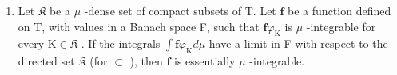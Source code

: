 \begin{enumerate}
\def\labelenumi{\arabic{enumi})}
\setcounter{enumi}{5}
\tightlist
\item
  Let \(\mathfrak{K}\) be a \(\mu\) -dense set of compact subsets of T. Let \(\mathbf{f}\) be a function defined on T, with values in a Banach space F, such that \(\mathbf{f}\varphi_{\mathrm{K}}\) is \(\mu\) -integrable for every \(\mathrm{K} \in \mathfrak{K}\) . If the integrals \(\int \mathbf{f}\varphi_{\mathrm{K}} d\mu\) have a limit in F with respect to the directed set \(\mathfrak{K}\) (for \(\subset\) ), then \(\mathbf{f}\) is essentially \(\mu\) -integrable.
\end{enumerate}

\setcounter{exercisegroup}{2}
\edef\CurrentExerciseGroup{\arabic{exercisegroup}}

